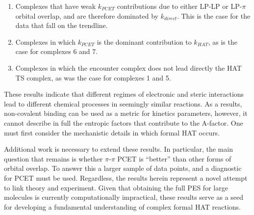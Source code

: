 \begin{enumerate}
  \item Complexes that have weak $k_{PCET}$ contributions due to either LP-LP
	  or LP-$\pi$ orbital overlap, and are therefore dominated by
	  $k_{direct}$. This is the case for the data that fall on the
	  trendline.

  \item Complexes in which $k_{PCET}$ is the dominant contribution to
	  $k_{HAT}$, as is the case for complexes 6 and 7.

  \item Complexes in which the encounter complex does not lead directly the
  HAT TS complex, as was the case for complexes 1 and 5.
\end{enumerate}

These results indicate that different regimes of electronic and steric
interactions lead to different chemical processes in seemingly similar
reactions. As a results, non-covalent binding can be used as a metric for
kinetics parameters, however, it cannot describe in full the entropic factors
that contribute to the A-factor. One must first consider the mechanistic
details in which formal HAT occurs.

Additional work is necessary to extend these results. In particular, the main
question that remains is whether $\pi$-$\pi$ PCET is ``better'' than other
forms of orbital overlap. To answer this a larger sample of data points, and a
diagnostic for PCET must be used. Regardless, the results herein represent a
novel attempt to link theory and experiment. Given that obtaining the full PES
for large molecules is currently computationally impractical, these results
serve as a seed for developing a fundamental understanding of complex formal HAT
reactions.
